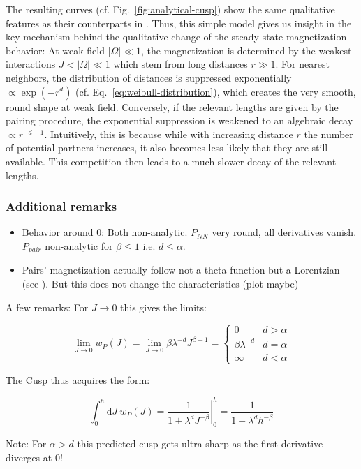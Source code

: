 The resulting curves (cf. Fig.~\ref{fig:analytical-cusp}) show the same qualitative features as their counterparts in \cite{franzEmergentPairLocalization2022}. Thus, this simple model gives us insight in the key mechanism behind the qualitative change of the steady-state magnetization behavior: At weak field $|\Omega|\ll 1$, the magnetization is determined by the weakest interactions $J<|\Omega|\ll 1$ which stem from long distances $r \gg 1$. For nearest neighbors, the distribution of distances is suppressed exponentially $\propto \exp(-r^d)$ (cf. Eq.~\ref{eq:weibull-distribution}), which creates the very smooth, round shape at weak field. Conversely, if the relevant lengths are given by the pairing procedure, the exponential suppression is weakened to an algebraic decay $\propto r^{-d-1}$. Intuitively, this is because while with increasing distance $r$ the number of potential partners increases, it also becomes less likely that they are still available. This competition then leads to a much slower decay of the relevant lengths.

\subsubsection{Additional remarks}
\begin{itemize}
	\item Behavior around 0: Both non-analytic. $P_{NN}$ very round, all derivatives vanish. $P_{pair}$ non-analytic for $\beta\leq1$ i.e. $d \leq \alpha$.
	\item Pairs' magnetization actually follow not a theta function but a Lorentzian (see \cite{franzObservationUniversalRelaxation2023}). But this does not change the characteristics (plot maybe)
	
\end{itemize}


A few remarks:
For $J\rightarrow 0$ this gives the limits:

\begin{equation}
	\lim_{J\rightarrow0} w_P(J) = \lim_{J\rightarrow0} \beta\lambda^{-d} J^{\beta-1} =\begin{cases}0 & d>\alpha\\ \beta\lambda^{-d} & d=\alpha\\ \infty & d<\alpha\end{cases}
\end{equation}

The Cusp thus acquires the form:

\begin{equation}
	\int_0^h\! \mathrm{d}J\ w_P(J) = \left. \frac{1}{1+\lambda^{d}J^{-\beta}}\right|_{0}^h = \frac{1}{1+\lambda^{d}h^{-\beta}}
\end{equation}

Note: For $\alpha > d$ this predicted cusp gets ultra sharp as the first derivative diverges at $0$!
